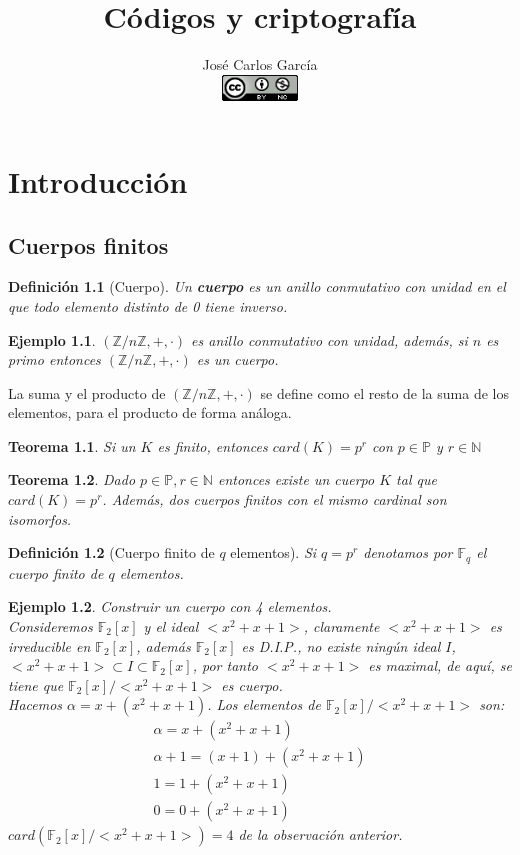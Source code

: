 \documentclass[spanish]{book}
\title{Códigos y criptografía}
\author{José Carlos García\\ \includegraphics[width=0.15\textwidth]{licencia.png}}
\newtheorem{mydef}{Definición}
\newtheorem{ejem}{Ejemplo}
\newtheorem{teorema}{Teorema}
\begin{document}
\maketitle
\tableofcontents

\chapter{Introducción}
\section{Cuerpos finitos}

\begin{mydef}[Cuerpo]
	Un \textbf{cuerpo} es un anillo conmutativo con unidad en el que todo elemento distinto de 0 tiene inverso.
\end{mydef}

\begin{ejem}
	$(\mathbb{Z}/ n \mathbb{Z}, +, \cdot)$ es anillo conmutativo con unidad, además, si $n$ es primo entonces $(\mathbb{Z}/ n \mathbb{Z}, +, \cdot)$ es un cuerpo.
\end{ejem} 
La suma y el producto de $(\mathbb{Z} / n \mathbb{Z}, +, \cdot)$ se define como el resto de la suma de los elementos, para el producto de forma análoga.
\begin{teorema}
	Si un $K$ es finito, entonces $card(K)=p^r$ con $p \in \mathbb{P}$ y $r \in \mathbb{N}$
\end{teorema}

\begin{teorema}
	Dado $p \in \mathbb{P}, r \in \mathbb{N}$ entonces existe un cuerpo $K$ tal que $card(K)=p^r$. 
	Además, dos cuerpos finitos con el mismo cardinal son isomorfos.
\end{teorema}

\begin{mydef}[Cuerpo finito de $q$ elementos]
	Si $q=p^r$ denotamos por $\mathbb{F}_q$ el cuerpo finito de $q$ elementos.
\end{mydef}

\begin{ejem}
	Construir un cuerpo con 4 elementos. \\
	Consideremos $\mathbb{F}_2[x]$ y el ideal $<x^2+x+1>$, claramente $<x^2+x+1>$ es irreducible en $\mathbb{F}_2[x]$, además $\mathbb{F}_2[x]$ es D.I.P., no existe ningún ideal $I$, $<x^2+x+1> \subset I \subset \mathbb{F}_2[x]$, por tanto $<x^2+x+1>$ es maximal, de aquí, se tiene que $\mathbb{F}_2[x] / <x^2+x+1>$ es cuerpo.\\
	Hacemos $\alpha = x+(x^2+x+1)$. Los elementos de $\mathbb{F}_2[x] / <x^2+x+1>$ son: 
	\begin{eqnarray}
	\alpha = x+(x^2+x+1) \nonumber \\
	\alpha + 1 = (x+1)+(x^2+x+1) \nonumber \\
	1 = 1 + (x^2+x+1) \nonumber \\
	0 = 0 + (x^2+x+1) \nonumber
	\end{eqnarray}
	$card(\mathbb{F}_2[x] / <x^2+x+1>)=4$ de la observación anterior.
\end{ejem}
\end{document}

